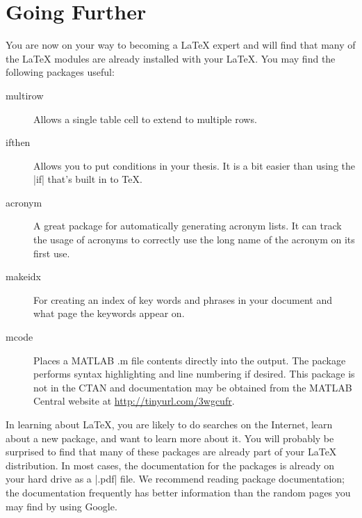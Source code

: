 \section{Going Further}
You are now on your way to becoming a \LaTeX{} expert and will find that many of the \LaTeX{} modules are already installed with your \LaTeX{}. 
You may find the following packages useful:

\begin{description}
\item[multirow] Allows a single table cell to extend to multiple
rows.

\item[ifthen]  Allows you to put conditions in your thesis. It is a
bit easier than using the |if| that's built in to \TeX.

\item[acronym]  A great package for automatically generating acronym lists.
It can track the usage of acronyms to correctly use the long name of the acronym
on its first use.

\item[makeidx]  For creating an index of key words and phrases in your document and what page the keywords appear on.

\item[mcode]  Places a MATLAB .m file contents directly into the output.  The
package performs syntax highlighting and line numbering if desired.  This package is not in the CTAN
and documentation may be obtained from the MATLAB Central website at \url{http://tinyurl.com/3wgcufr}.

\end{description}

In learning about \LaTeX{}, you are likely to do searches on the Internet, learn
about a new package, and want to learn more about it. You will
probably be surprised to find that many of these packages are already
part of your \LaTeX{} distribution. In most cases, the documentation for
the packages is already on your hard drive as a |.pdf| file.  We
recommend reading package documentation; the documentation frequently
has better information than the random pages you may find by using Google.

